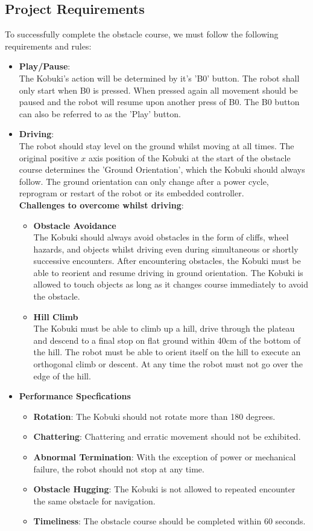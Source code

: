 \documentclass[11pt]{article}
\begin{document}
\subsection{Project Requirements}
To successfully complete the obstacle course, we must follow the following requirements and rules:
\begin{itemize}
    \item \textbf{Play/Pause}:\\
    The Kobuki's action will be determined by it's 'B0' button. The robot shall only start when B0 is pressed. When pressed again all movement should be paused and the robot will resume upon another press of B0. The B0 button can also be referred to as the 'Play' button.
    \item \textbf{Driving}:\\
    The robot should stay level on the ground whilst moving at all times. The original positive $x$ axis position of the Kobuki at the start of the obstacle course determines the 'Ground Orientation', which the Kobuki should always follow. The ground orientation can only change after a power cycle, reprogram or restart of the robot or its embedded controller.\\
    \textbf{Challenges to overcome whilst driving}:
    \begin{itemize}
        \item \textbf{Obstacle Avoidance}\\
        The Kobuki should always avoid obstacles in the form of cliffs, wheel hazards, and objects whilst driving even during simultaneous or shortly successive encounters. After encountering obstacles, the Kobuki must be able to reorient and resume driving in ground orientation. The Kobuki is allowed to touch objects as long as it changes course immediately to avoid the obstacle. 
        \item \textbf{Hill Climb}\\
        The Kobuki must be able to climb up a hill, drive through the plateau and descend to a final stop on flat ground within 40cm of the bottom of the hill. The robot must be able to orient itself on the hill to execute an orthogonal climb or descent. At any time the robot must not go over the edge of the hill.
    \end{itemize}
    \item \textbf{Performance Specfications}
    \begin{itemize}
        \item \textbf{Rotation}: The Kobuki should not rotate more than 180 degrees.
        \item \textbf{Chattering}: Chattering and erratic movement should not be exhibited.
        \item \textbf{Abnormal Termination}: With the exception of power or mechanical failure, the robot should not stop at any time.
        \item \textbf{Obstacle Hugging}: The Kobuki is not allowed to repeated encounter the same obstacle for navigation.
        \item \textbf{Timeliness}: The obstacle course should be completed within 60 seconds.
    \end{itemize}
\end{itemize}
\end{document}
